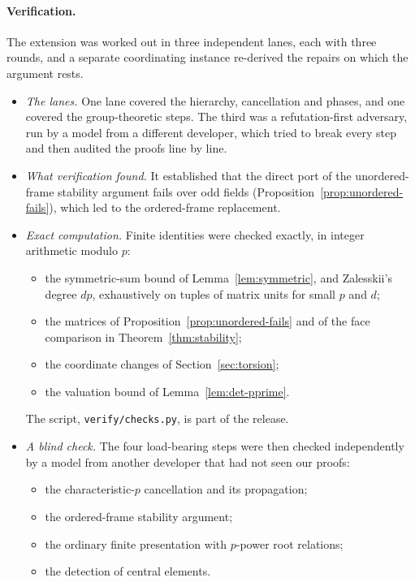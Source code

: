 \paragraph{Verification.} The extension was worked out in three independent lanes, each with three rounds, and a separate
coordinating instance re-derived the repairs on which the argument rests.
\begin{itemize}[leftmargin=*]
\item \emph{The lanes.} One lane covered the hierarchy, cancellation and phases, and one covered the group-theoretic
  steps. The third was a refutation-first adversary, run by a model from a different developer, which tried to break
  every step and then audited the proofs line by line.
\item \emph{What verification found.} It established that the direct port of the unordered-frame stability argument
  fails over odd fields (Proposition~\ref{prop:unordered-fails}), which led to the ordered-frame replacement.
\item \emph{Exact computation.} Finite identities were checked exactly, in integer arithmetic modulo $p$:
  \begin{itemize}
  \item the symmetric-sum bound of Lemma~\ref{lem:symmetric}, and Zalesskii's degree $dp$, exhaustively on tuples of
    matrix units for small $p$ and $d$;
  \item the matrices of Proposition~\ref{prop:unordered-fails} and of the face comparison in
    Theorem~\ref{thm:stability};
  \item the coordinate changes of Section~\ref{sec:torsion};
  \item the valuation bound of Lemma~\ref{lem:det-pprime}.
  \end{itemize}
  The script, \texttt{verify/checks.py}, is part of the release.
\item \emph{A blind check.} The four load-bearing steps were then checked independently by a model from another developer
  that had not seen our proofs:
  \begin{itemize}
  \item the characteristic-$p$ cancellation and its propagation;
  \item the ordered-frame stability argument;
  \item the ordinary finite presentation with $p$-power root relations;
  \item the detection of central elements.
  \end{itemize}

\end{itemize}
